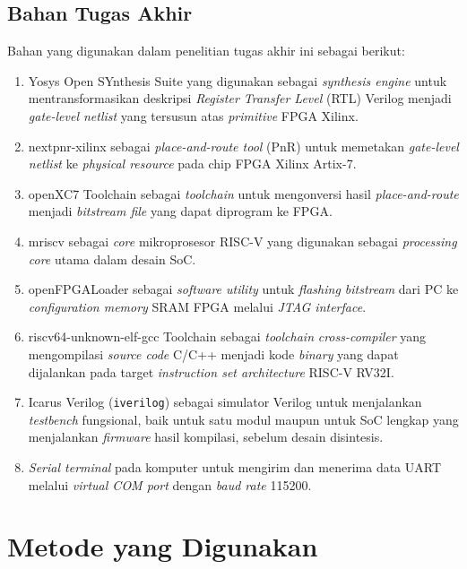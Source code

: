 \subsection{Bahan Tugas Akhir}
\label{subsec:bahan-tugas-akhir}

Bahan yang digunakan dalam penelitian tugas akhir ini sebagai berikut:

\begin{enumerate}
	\item Yosys Open SYnthesis Suite yang digunakan sebagai \textit{synthesis engine} untuk mentransformasikan deskripsi \textit{Register Transfer Level} (RTL) Verilog menjadi \textit{gate-level netlist} yang tersusun atas \textit{primitive} FPGA Xilinx.
	\item nextpnr-xilinx sebagai \textit{place-and-route tool} (PnR) untuk memetakan \textit{gate-level netlist} ke \textit{physical resource} pada chip FPGA Xilinx Artix-7.
	\item openXC7 Toolchain sebagai \textit{toolchain} untuk mengonversi hasil \textit{place-and-route} menjadi \textit{bitstream file} yang dapat diprogram ke FPGA.
	\item mriscv sebagai \textit{core} mikroprosesor RISC-V yang digunakan sebagai \textit{processing core} utama dalam desain SoC.
	\item openFPGALoader sebagai \textit{software utility} untuk \textit{flashing bitstream} dari PC ke \textit{configuration memory} SRAM FPGA melalui \textit{JTAG interface}.
	\item riscv64-unknown-elf-gcc Toolchain sebagai \textit{toolchain} \textit{cross-compiler} yang mengompilasi \textit{source code} C/C++ menjadi kode \textit{binary} yang dapat dijalankan pada target \textit{instruction set architecture} RISC-V RV32I.
	\item Icarus Verilog (\texttt{iverilog}) sebagai simulator Verilog untuk menjalankan \textit{testbench} fungsional, baik untuk satu modul maupun untuk SoC lengkap yang menjalankan \textit{firmware} hasil kompilasi, sebelum desain disintesis.
	\item \textit{Serial terminal} pada komputer untuk mengirim dan menerima data UART melalui \textit{virtual COM port} dengan \textit{baud rate} 115200.
\end{enumerate}



\section{Metode yang Digunakan}
\label{sec:metode-digunakan}

